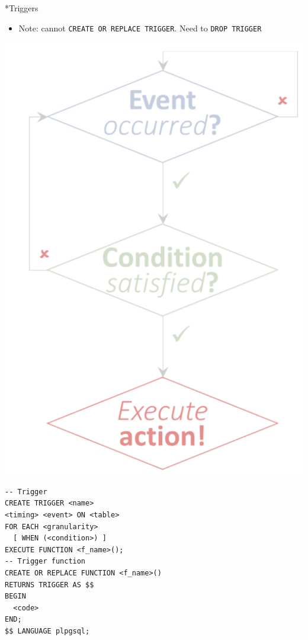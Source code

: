 \documentclass[a4paper]{article}
\makeatletter
\newcommand{\uppercaseandunderline}[1]{\uline{\uppercase{#1}}}
\renewcommand{\section}{
  \@startsection{section}{1}{0pt}{1ex}{1ex} {\raggedleft\normalfont\normalsize\bfseries\uppercaseandunderline}}
\newcommand{\ic}[1]{\lstinline{#1}}
\makeatother
\begin{document}
\begin{multicols}{2}
\section*{Triggers} \noindent
  \begin{itemize}[leftmargin=*]
    \item Note: cannot \ic{CREATE OR REPLACE TRIGGER}. Need to \ic{DROP TRIGGER}
  \end{itemize}
  \begin{minipage}{0.35\columnwidth}
    \includegraphics[width=\columnwidth]{L9/trigger_workflow}
  \end{minipage}
  \begin{minipage}{0.63\columnwidth}
    \begin{lstlisting}
-- Trigger
CREATE TRIGGER <name>
<timing> <event> ON <table>
FOR EACH <granularity>
  [ WHEN (<condition>) ]
EXECUTE FUNCTION <f_name>();
-- Trigger function
CREATE OR REPLACE FUNCTION <f_name>()
RETURNS TRIGGER AS $$
BEGIN
  <code>
END;
$$ LANGUAGE plpgsql;
    \end{lstlisting}
  \end{minipage}

\end{multicols}
\end{document}
